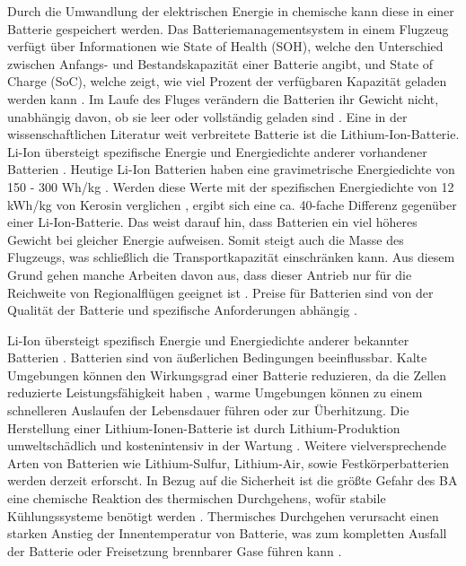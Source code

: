 Durch die Umwandlung der elektrischen Energie in chemische kann diese in einer Batterie gespeichert werden. 
Das Batteriemanagementsystem in einem Flugzeug verfügt über Informationen wie State of Health (SOH), 
welche den Unterschied zwischen Anfangs- und Bestandskapazität einer Batterie angibt, 
und State of Charge (SoC), welche zeigt, wie viel Prozent der verfügbaren Kapazität geladen werden kann \cite{donckers2024electric}.
Im Laufe des Fluges verändern die Batterien ihr Gewicht nicht, unabhängig davon, ob sie leer oder vollständig geladen sind \cite{donckers2024electric}. 
Eine in der wissenschaftlichen Literatur weit verbreitete Batterie ist die Lithium-Ion-Batterie.  
Li-Ion übersteigt spezifische Energie und Energiedichte anderer vorhandener Batterien \cite{budde2013review}.
%
Heutige Li-Ion Batterien haben eine gravimetrische Energiedichte von 150 - 300 Wh/kg \cite{colpan2022fuel}. 
Werden diese Werte mit der spezifischen Energiedichte von 12 kWh/kg von Kerosin verglichen \cite{dalmia2022powering},
ergibt sich eine ca. 40-fache Differenz gegenüber einer Li-Ion-Batterie. 
Das weist darauf hin, dass Batterien ein viel höheres Gewicht bei gleicher Energie aufweisen. 
Somit steigt auch die Masse des Flugzeugs, was schließlich die Transportkapazität einschränken kann. 
Aus diesem Grund gehen manche Arbeiten davon aus, dass dieser Antrieb 
nur für die Reichweite von Regionalflügen geeignet ist \cite{abrantes2024impact}.
Preise für Batterien sind von der Qualität der Batterie und spezifische Anforderungen abhängig \cite{budde2013review}.

Li-Ion übersteigt spezifisch Energie und Energiedichte anderer bekannter Batterien \cite{budde2013review}.
%
Batterien sind von äußerlichen Bedingungen beeinflussbar. 
Kalte Umgebungen können den Wirkungsgrad einer Batterie reduzieren, da die Zellen reduzierte Leistungsfähigkeit haben \cite{budde2013review}, 
warme Umgebungen können zu einem schnelleren Auslaufen der Lebensdauer führen \cite{donckers2024electric} oder zur Überhitzung. 
Die Herstellung einer Lithium-Ionen-Batterie ist durch Lithium-Produktion umweltschädlich 
und kostenintensiv in der Wartung \cite{dalmia2022powering}. 
Weitere vielversprechende Arten von Batterien wie 
Lithium-Sulfur, Lithium-Air, sowie Festkörperbatterien werden derzeit erforscht.
%
%
%
In Bezug auf die Sicherheit ist die größte Gefahr des BA eine chemische Reaktion des thermischen Durchgehens, 
wofür stabile Kühlungssysteme benötigt werden \cite{donckers2024electric}. 
Thermisches Durchgehen verursacht einen starken Anstieg der Innentemperatur von Batterie, 
was zum kompletten Ausfall der Batterie oder Freisetzung brennbarer Gase führen kann \cite{shahid2022review}.


